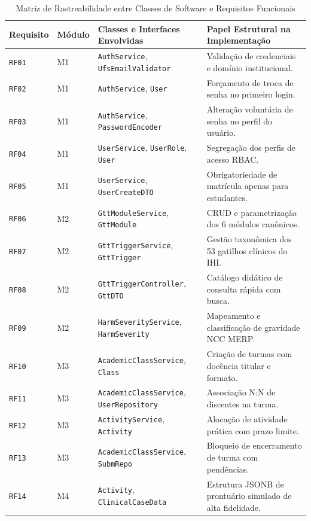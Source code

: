\begin{table}[!ht]
\centering
\caption{Matriz de Rastreabilidade entre Classes de Software e Requisitos Funcionais}
\label{tab_rastreabilidade_classes_rf}
\footnotesize
\begin{tabularx}{\textwidth}{p{1.8cm} p{1.4cm} p{4.8cm} X}
\toprule
\textbf{Requisito} & \textbf{Módulo} & \textbf{Classes e Interfaces Envolvidas} & \textbf{Papel Estrutural na Implementação} \\
\midrule
\texttt{RF01} & M1 & \texttt{AuthService}, \texttt{UfsEmailValidator} & Validação de credenciais e domínio institucional. \\
\texttt{RF02} & M1 & \texttt{AuthService}, \texttt{User} & Forçamento de troca de senha no primeiro login. \\
\texttt{RF03} & M1 & \texttt{AuthService}, \texttt{PasswordEncoder} & Alteração voluntária de senha no perfil do usuário. \\
\texttt{RF04} & M1 & \texttt{UserService}, \texttt{UserRole}, \texttt{User} & Segregação dos perfis de acesso RBAC. \\
\texttt{RF05} & M1 & \texttt{UserService}, \texttt{UserCreateDTO} & Obrigatoriedade de matrícula apenas para estudantes. \\
\texttt{RF06} & M2 & \texttt{GttModuleService}, \texttt{GttModule} & CRUD e parametrização dos 6 módulos canônicos. \\
\texttt{RF07} & M2 & \texttt{GttTriggerService}, \texttt{GttTrigger} & Gestão taxonômica dos 53 gatilhos clínicos do IHI. \\
\texttt{RF08} & M2 & \texttt{GttTriggerController}, \texttt{GttDTO} & Catálogo didático de consulta rápida com busca. \\
\texttt{RF09} & M2 & \texttt{HarmSeverityService}, \texttt{HarmSeverity} & Mapeamento e classificação de gravidade NCC MERP. \\
\texttt{RF10} & M3 & \texttt{AcademicClassService}, \texttt{Class} & Criação de turmas com docência titular e formato. \\
\texttt{RF11} & M3 & \texttt{AcademicClassService}, \texttt{UserRepository} & Associação N:N de discentes na turma. \\
\texttt{RF12} & M3 & \texttt{ActivityService}, \texttt{Activity} & Alocação de atividade prática com prazo limite. \\
\texttt{RF13} & M3 & \texttt{AcademicClassService}, \texttt{SubmRepo} & Bloqueio de encerramento de turma com pendências. \\
\texttt{RF14} & M4 & \texttt{Activity}, \texttt{ClinicalCaseData} & Estrutura JSONB de prontuário simulado de alta fidelidade. \\

\end{tabularx}
\end{table}
